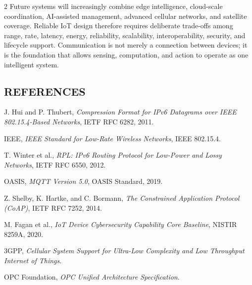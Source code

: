 \begin{multicols}{2}
  \noindent
  Future systems will increasingly combine edge intelligence, cloud-scale coordination, AI-assisted management, advanced cellular networks, and satellite coverage. Reliable IoT design therefore requires deliberate trade-offs among range, rate, latency, energy, reliability, scalability, interoperability, security, and lifecycle support. Communication is not merely a connection between devices; it is the foundation that allows sensing, computation, and action to operate as one intelligent system.

  \subsection*{\centering\uppercase{References}}
  {\small
  \begin{justify}
    \begin{enumerate}[label={\relax[\arabic*]},leftmargin=*,labelsep=0.5em,itemsep=0.20em,parsep=0pt]
      \item J. Hui and P. Thubert, \textit{Compression Format for IPv6 Datagrams over IEEE 802.15.4-Based Networks}, IETF RFC 6282, 2011.
      \item IEEE, \textit{IEEE Standard for Low-Rate Wireless Networks}, IEEE 802.15.4.
      \item T. Winter et al., \textit{RPL: IPv6 Routing Protocol for Low-Power and Lossy Networks}, IETF RFC 6550, 2012.
      \item OASIS, \textit{MQTT Version 5.0}, OASIS Standard, 2019.
      \item Z. Shelby, K. Hartke, and C. Bormann, \textit{The Constrained Application Protocol (CoAP)}, IETF RFC 7252, 2014.
      \item M. Fagan et al., \textit{IoT Device Cybersecurity Capability Core Baseline}, NISTIR 8259A, 2020.
      \item 3GPP, \textit{Cellular System Support for Ultra-Low Complexity and Low Throughput Internet of Things}.
      \item OPC Foundation, \textit{OPC Unified Architecture Specification}.
    \end{enumerate}
  \end{justify}}
\end{multicols}
\endgroup
